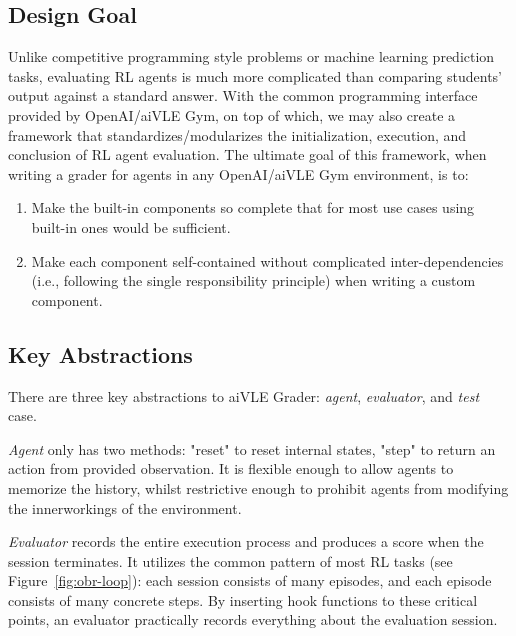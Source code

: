 \subsection{Design Goal}
Unlike competitive programming style problems or machine learning prediction tasks, evaluating RL agents is much more complicated than comparing students’ output against a standard answer. With the common programming interface provided by OpenAI/aiVLE Gym, on top of which, we may also create a framework that standardizes/modularizes the initialization, execution, and conclusion of RL agent evaluation. The ultimate goal of this framework, when writing a grader for agents in any OpenAI/aiVLE Gym environment, is to:
\begin{enumerate}
    \item Make the built-in components so complete that for most use cases using built-in ones would be sufficient.
    \item Make each component self-contained without complicated inter-dependencies (i.e., following the single responsibility principle) when writing a custom component.
\end{enumerate}

\subsection{Key Abstractions}
There are three key abstractions to aiVLE Grader: \textit{agent}, \textit{evaluator}, and \textit{test} case.

\textit{Agent} only has two methods: "reset" to reset internal states, "step" to return an action from provided observation. It is flexible enough to allow agents to memorize the history, whilst restrictive enough to prohibit agents from modifying the innerworkings of the environment.

\textit{Evaluator} records the entire execution process and produces a score when the session terminates. It utilizes the common pattern of most RL tasks (see Figure~\ref{fig:obr-loop}): each session consists of many episodes, and each episode consists of many concrete steps. By inserting hook functions to these critical points, an evaluator practically records everything about the evaluation session. 

